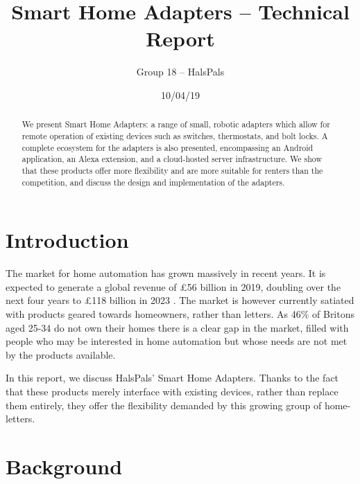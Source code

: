 \documentclass[onecolumn]{IEEEtran}
\begin{document}
\title{Smart Home Adapters -- Technical Report}
\author{Group 18 -- HalsPals}
\date{10/04/19} 
\maketitle

\begin{abstract}

    We present Smart Home Adapters: a range of small, robotic adapters which 
    allow for remote operation of existing devices such as switches, thermostats,
    and bolt locks. A complete ecosystem for the adapters is also presented, 
    encompassing an Android application, an Alexa extension, and a cloud-hosted 
    server infrastructure. We show that these products offer more flexibility 
    and are more suitable for renters than the competition, and discuss the 
    design and implementation of the adapters.
    
\end{abstract}

\section{Introduction}
{The market for home automation has grown massively in recent years. It is 
expected to generate a global revenue of £56 billion in 2019, doubling over 
the next four years to £118 billion in 2023 \cite{smarthomemarket}. The market is however currently satiated
with products geared towards homeowners, rather than letters. As 46\% of Britons
aged 25-34 do not own their homes \cite{homeowners} there is a clear gap in the market, filled with
people who may be interested in home automation but whose needs are not met by 
the products available.}

{In this report, we discuss HalsPals' Smart Home Adapters. Thanks to the fact that these products merely interface with existing devices, rather than replace them entirely, they offer the flexibility demanded by this growing group of home-letters.}

\section{Background}
\end{document}
